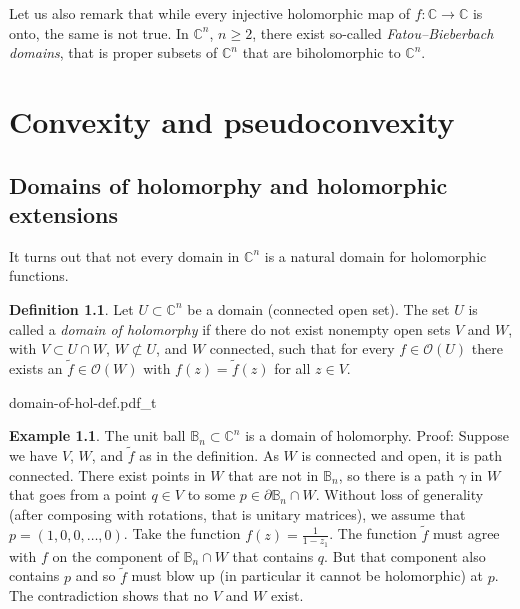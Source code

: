 \documentclass[12pt,openany]{book}
\newcommand{\C}{{\mathbb{C}}}
\newcommand{\bB}{{\mathbb{B}}}
\newcommand{\sO}{{\mathcal{O}}}
\newcommand{\myindex}[1]{#1\index{#1}}
\theoremstyle{plain}
\theoremstyle{remark}
\theoremstyle{definition}
\newtheorem{defn}[thm]{Definition}
\theoremstyle{exercise}
\theoremstyle{example}
\newtheorem{example}[thm]{Example}
\begin{document}
Let us also remark that while every injective holomorphic
map of $f \colon \C \to \C$ is onto, the same is not true.
In $\C^n$, $n \geq 2$, there exist so-called
\emph{Fatou--Bieberbach domains},
that is proper subsets of $\C^n$ that are biholomorphic to $\C^n$.



\chapter{Convexity and pseudoconvexity} \label{ch:convexity}


\section{Domains of holomorphy and holomorphic extensions}

It turns out that not every domain in $\C^n$ is a natural domain for
holomorphic functions.

\begin{defn}
Let $U \subset \C^n$ be a domain (connected open set).  The set $U$ is
called a \emph{\myindex{domain of holomorphy}} if there do not exist
nonempty open sets
$V$ and $W$, with $V \subset U \cap W$, $W \not\subset U$, and $W$
connected, such that for every $f \in \sO(U)$ there exists an $\widetilde{f} \in
\sO(W)$ with $f(z) = \widetilde{f}(z)$ for all $z \in V$.
\end{defn}


\begin{center}
{domain-of-hol-def.pdf_t}
\end{center}


\begin{example}
The unit ball $\bB_n \subset \C^n$ is a domain of holomorphy.  Proof: 
Suppose we have $V$, $W$, and $\widetilde{f}$ as in the definition.  As $W$ is
connected and open, it is path connected.  There exist
points in $W$ that are not in $\bB_n$, so there
is a path $\gamma$ in $W$ that goes
from a point $q \in V$ to some $p \in \partial \bB_n \cap W$.
Without loss of generality (after composing with
rotations, that is unitary matrices), we assume that $p =
(1,0,0,\ldots,0)$.  Take the function $f(z) = \frac{1}{1-z_1}$.  
The function $\widetilde{f}$ must agree with $f$ on the component of
$\bB_n \cap W$ that contains $q$.  But that component also contains $p$ and
so $\widetilde{f}$ must blow up (in particular it cannot be holomorphic) at
$p$.  The contradiction shows that no $V$ and $W$ exist.
\end{example}
\end{document}
